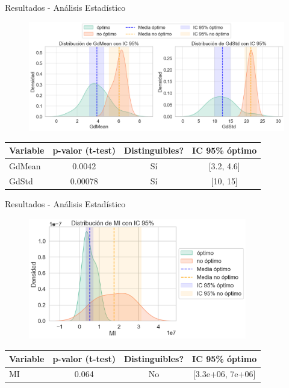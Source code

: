 \documentclass{beamer}
\begin{document}
\begin{frame}{Resultados - Análisis Estadístico}
    \begin{table}
        \centering
        \begin{figure}
            \includegraphics[width=\textwidth]{TGdMeanGdStd.png}
        \end{figure}
        \begin{tabular}{|l|c|c|c|}
            \hline
            \textbf{Variable} & \textbf{p-valor (t-test)} & \textbf{Distinguibles?} & \textbf{IC 95\% óptimo} \\
            \hline
            GdMean & 0.0042 & Sí & [3.2, 4.6] \\
            GdStd & 0.00078 & Sí & [10, 15] \\
            \hline
        \end{tabular}
    \end{table}
\end{frame}

\begin{frame}{Resultados - Análisis Estadístico}
    \begin{table}
        \centering
        \begin{figure}
            \includegraphics[width=0.85\textwidth]{TMi.png}
        \end{figure}
        \begin{tabular}{|l|c|c|c|}
            \hline
            \textbf{Variable} & \textbf{p-valor (t-test)} & \textbf{Distinguibles?} & \textbf{IC 95\% óptimo} \\
            \hline
            MI & 0.064 & No & [3.3e+06, 7e+06] \\
            \hline
        \end{tabular}
    \end{table}
\end{frame}
\end{document}
